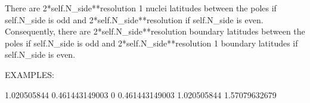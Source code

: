 \documentclass[a4paper,12ptopenany,oneside,english]{sphinxmanual}
\begin{document}
\begin{fulllineitems}
\begin{fulllineitems}
\sphinxAtStartPar
There are 2*self.N\_side**resolution \sphinxhyphen{} 1 nuclei
latitudes between the poles if self.N\_side is odd and
2*self.N\_side**resolution if self.N\_side is even.
Consequently, there are 2*self.N\_side**resolution
boundary latitudes between the poles if self.N\_side is odd and
2*self.N\_side**resolution \sphinxhyphen{} 1 boundary latitudes if self.N\_side is
even.

\sphinxAtStartPar
EXAMPLES:

\begin{sphinxVerbatim}[commandchars=\\\{\}]
  
      
     
\end{sphinxVerbatim}
\begin{description}
\sphinxAtStartPar
\sphinxhyphen{}1.020505844
\sphinxhyphen{}0.461443149003
\sphinxhyphen{}0
0.461443149003
1.020505844
1.57079632679

\begin{sphinxVerbatim}[commandchars=\\\{\}]
       
     
\end{sphinxVerbatim}


\end{description}
\end{fulllineitems}
\end{fulllineitems}
\end{document}
